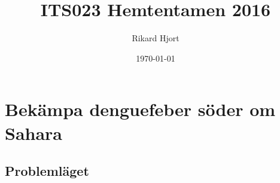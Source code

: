 \documentclass{article}
\title{ITS023 Hemtentamen 2016}
\date{\today}
\author{Rikard Hjort}
\begin{document}
\maketitle

\section{Bekämpa denguefeber söder om Sahara}

\subsection{Problemläget}

\clearpage
\section{}

\clearpage
\section{}

\clearpage
\section{}

 


\end{document}
